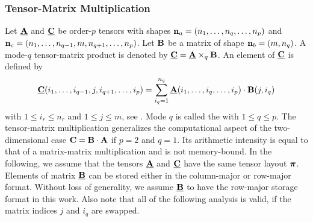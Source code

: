 \subsubsection{Tensor-Matrix Multiplication}
Let $\underline{\mathbf{A}}$ and $\underline{\mathbf{C}}$ be order-$p$ tensors with shapes $\mathbf{n}_a = (n_1,\dots,n_q,\dots,n_p)$ and $\mathbf{n}_c =(n_1,\dots,n_{q-1},m,n_{q+1},\dots,n_p)$. 
Let $\mathbf{B}$ be a matrix of shape $\mathbf{n}_b = (m,n_q)$.
A mode-$q$ tensor-matrix product is denoted by $\underline{\mathbf{C}} = \underline{\mathbf{A}} \times_q \mathbf{B}$. 
An element of $\underline{\mathbf{C}}$ is defined by
\begin{equation}
\label{equ:tensor.matrix.multplication}
\underline{\mathbf{C}}(i_1, \dots, i_{q-1}, j, i_{q+1}, \dots, i_p) = \sum_{i_q=1}^{n_q} \underline{\mathbf{A}}(i_1, \dots, i_q, \dots, i_p) \cdot \mathbf{B}(j,i_q)
\end{equation}
with $1 \leq i_r \leq n_r$ and $1 \leq j \leq m$, see \cite{li:2015:input, kolda:2009:decompositions}.
Mode $q$ is called the   with $1 \leq q \leq p$.
The tensor-matrix multiplication generalizes the computational aspect of the two-dimensional case $\mathbf{C} = \mathbf{B} \cdot \mathbf{A}$ if $p=2$ and $q=1$.
Its arithmetic intensity is equal to that of a matrix-matrix multiplication and is not memory-bound.
In the following, we assume that the tensors $\underline{\mathbf{A}}$ and $\underline{\mathbf{C}}$ have the same tensor layout $\boldsymbol{\pi}$. 
Elements of matrix $\underline{\mathbf{B}}$ can be stored either in the column-major or row-major format.
Without loss of generality, we assume $\underline{\mathbf{B}}$ to have the row-major storage format in this work.
Also note that all of the following analysis is valid, if the matrix indices $j$ and $i_q$ are swapped.
